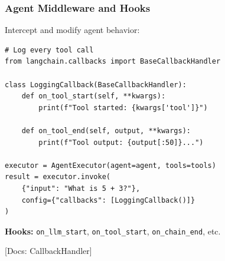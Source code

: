 \documentclass[aspectratio=169,11pt]{beamer}
\newcommand{\docref}[1]{{\scriptsize\color{docgray}[Docs: #1]}}
\begin{document}
\begin{frame}[fragile]
\frametitle{Agent Middleware and Hooks}

Intercept and modify agent behavior:

\begin{lstlisting}
# Log every tool call
from langchain.callbacks import BaseCallbackHandler

class LoggingCallback(BaseCallbackHandler):
    def on_tool_start(self, **kwargs):
        print(f"Tool started: {kwargs['tool']}")

    def on_tool_end(self, output, **kwargs):
        print(f"Tool output: {output[:50]}...")

executor = AgentExecutor(agent=agent, tools=tools)
result = executor.invoke(
    {"input": "What is 5 + 3?"},
    config={"callbacks": [LoggingCallback()]}
)
\end{lstlisting}

\textbf{Hooks:} \texttt{on\_llm\_start}, \texttt{on\_tool\_start}, \texttt{on\_chain\_end}, etc.

\docref{CallbackHandler}

\end{frame}
\end{document}
